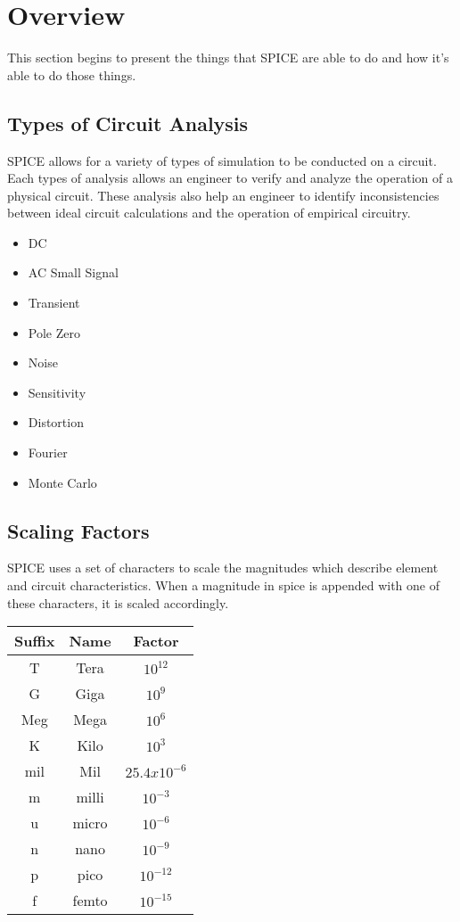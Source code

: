 \documentclass{article}
\begin{document}
\section{Overview}
This section begins to present the things that SPICE are able to do and how it's able to do those things. 
\subsection{Types of Circuit Analysis}
SPICE allows for a variety of types of simulation to be conducted on a circuit. Each types of analysis allows an engineer to verify and analyze the operation of a physical circuit. These analysis also help an engineer to identify inconsistencies between ideal circuit calculations and the operation of empirical circuitry.
\begin{itemize}
\item DC
\item AC Small Signal 
\item Transient
\item Pole Zero
\item Noise
\item Sensitivity
\item Distortion
\item Fourier
\item Monte Carlo
\end{itemize}
\subsection{Scaling Factors}
SPICE uses a set of characters to scale the magnitudes which describe element and circuit characteristics. When a magnitude in spice is appended with one of these characters, it is scaled accordingly.
\begin{center}
\begin{tabular}{||c|c|c||}
\hline
Suffix & Name & Factor \\
\hline \hline
T & Tera & $10^{12}$ \\
\hline
G & Giga & $10^9$ \\
\hline
Meg & Mega & $10^6$ \\
\hline
K & Kilo & $10^3$ \\
\hline
mil & Mil & $25.4x10^{-6}$ \\
\hline
m & milli & $10^{-3}$ \\
\hline
u & micro & $10^{-6}$ \\
\hline
n & nano & $10^{-9}$ \\ 
\hline
p & pico & $10^{-12}$ \\
\hline
f & femto & $10^{-15}$ \\
\hline
\end{tabular}
\end{center}
\end{document}
